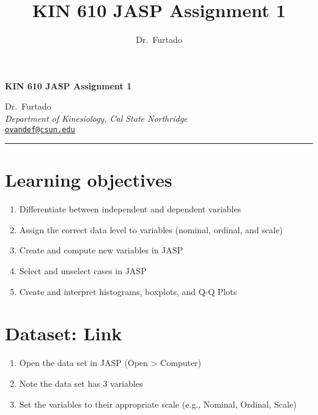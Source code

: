 \documentclass[11pt,]{article}
\title{KIN 610 \textbar{} JASP Assignment 1}
\author{Dr.~Furtado}
\date{}
\newcommand{\blankline}{\quad\pagebreak[2]}
\providecommand{\tightlist}{%
  \setlength{\itemsep}{0pt}\setlength{\parskip}{0pt}}
\begin{document}
  



\thispagestyle{plain} 

\begin{flushleft}\Large \bf KIN 610 \textbar{} JASP Assignment
1  \end{flushleft}
	\vspace{1 mm}   
Dr.~Furtado \\
\emph{Department of Kinesiology, Cal State Northridge} \\
\texttt{\href{mailto:ovandef@csun.edu}{\nolinkurl{ovandef@csun.edu}}}   \\

  

\hrule

\vspace{6 mm}
	


\hypertarget{learning-objectives}{%
\section{Learning objectives}\label{learning-objectives}}

\begin{enumerate}
\def\labelenumi{\arabic{enumi}.}
\tightlist
\item
  Differentiate between independent and dependent variables
\item
  Assign the correct data level to variables (nominal, ordinal, and
  scale)
\item
  Create and compute new variables in JASP
\item
  Select and unselect cases in JASP
\item
  Create and interpret histograms, boxplots, and Q-Q Plots
\end{enumerate}

\hypertarget{dataset-link}{%
\section{Dataset: Link}\label{dataset-link}}

\begin{enumerate}
\def\labelenumi{\arabic{enumi}.}
\tightlist
\item
  Open the data set in JASP (Open \textgreater{} Computer)
\item
  Note the data set has 3 variables
\item
  Set the variables to their appropriate scale (e.g., Nominal, Ordinal,
  Scale)
\end{enumerate}
\end{document}

